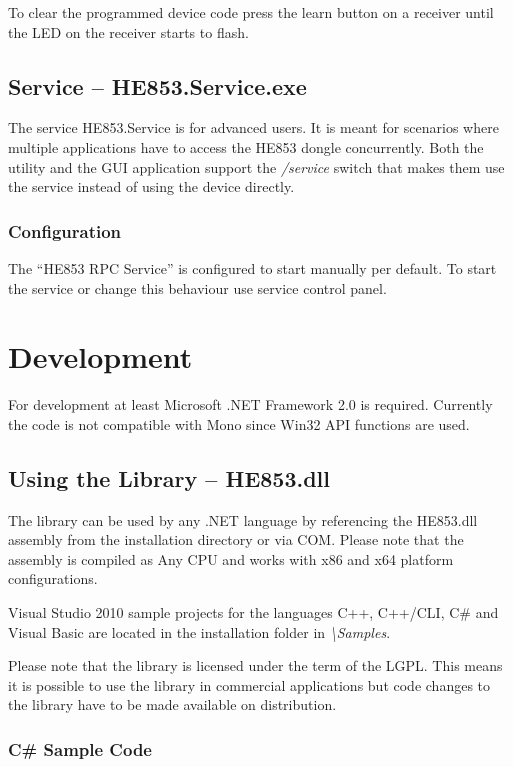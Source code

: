 \documentclass[
a4paper,
oneside,
halfparskip*,
normalheadings,
]
{scrbook}
\begin{document}
To clear the programmed device code press the learn button on a receiver until the LED
on the receiver starts to flash.

\section{Service -- HE853.Service.exe}

The service HE853.Service is for advanced users. It is meant for scenarios where multiple
applications have to access the HE853 dongle concurrently. Both the utility and the
GUI application support the \textit{/service} switch that makes them use the service
instead of using the device directly.

\subsection{Configuration}

The "`HE853 RPC Service"' is configured to start manually per default. To start the service
or change this behaviour use service control panel. 




\chapter{Development}

For development at least Microsoft .NET Framework 2.0 is required. Currently the code
is not compatible with Mono since Win32 API functions are used.

\section{Using the Library -- HE853.dll}

The library can be used by any .NET language by referencing the HE853.dll assembly from the
installation directory or via COM. Please note that the assembly is compiled as Any CPU
and works with x86 and x64 platform configurations.

Visual Studio 2010 sample projects for the languages C++, C++/CLI, C\# and Visual Basic
are located in the installation folder in \textit{\textbackslash Samples}.

Please note that the library is licensed under the term of the LGPL. This means it is
possible to use the library in commercial applications but code changes to the library
have to be made available on distribution.

\subsection{C\# Sample Code}
\end{document}
